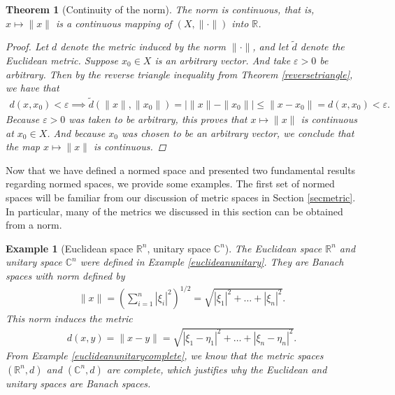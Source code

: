 \documentclass[11pt]{article}
\theoremstyle{mystyle}
\newtheorem{thm}{Theorem}[section]
\newtheorem{protoexamp}{Example}[section]
\newenvironment{examp}
{\colorlet{shadecolor}{orange!15}\begin{shaded}\begin{protoexamp}}
{\end{protoexamp}\end{shaded}}
\newcommand{\0}{\mathbf{0}}
\begin{document}
\begin{thm}[Continuity of the norm]\label{normcontinuous}
The norm is continuous, that is, $x \longmapsto \| x\|$ is a continuous mapping of $(X, \| \cdot \|)$ into $\mathbb{R}$.
\begin{proof}
Let $d$ denote the metric induced by the norm $\| \cdot \|$, and let $\tilde{d}$ denote the Euclidean metric.
Suppose $x_0 \in X$ is an arbitrary vector. And take $\varepsilon > 0$ be arbitrary.\newline
Then by the reverse triangle inequality from Theorem \ref{reversetriangle}, we have that
\begin{align*}
    d(x, x_0) < \varepsilon \implies \tilde{d}(\| x\|, \| x_0\|) = \left| \|x\| - \| x_0 \| \right| \leq \| x - x_0\| = d(x, x_0) < \varepsilon.
\end{align*}
Because $\varepsilon > 0$ was taken to be arbitrary, this proves that $x \longmapsto \| x\|$ is continuous at $x_0 \in X$. And because $x_0$ was chosen to be an arbitrary vector, we conclude that the map $x \longmapsto \| x\|$ is continuous.
\end{proof}
\end{thm}

Now that we have defined a normed space and presented two fundamental results regarding normed spaces, we provide some examples. The first set of normed spaces will be familiar from our discussion of metric spaces in Section \ref{secmetric}. In particular, many of the metrics we discussed in this section can be obtained from a norm.
\begin{examp}[Euclidean space $\mathbb{R}^n$, unitary space $\mathbb{C}^n$]\label{euclideanunitarynorm}
The Euclidean space $\mathbb{R}^n$ and unitary space $\mathbb{C}^n$ were defined in Example \ref{euclideanunitary}. They are Banach spaces with norm defined by
\begin{align*}
    \| x \| = \left( \sum_{i=1}^n |\xi_i|^2 \right)^{1/2} = \sqrt{|\xi_1|^2 + \ldots + |\xi_n|^2}.
\end{align*}
This norm induces the metric
\begin{align*}
    d(x, y) = \| x - y\| = \sqrt{|\xi_1 - \eta_1|^2 + \ldots + |\xi_n - \eta_n|^2}.
\end{align*}
From Example \ref{euclideanunitarycomplete}, we know that the metric spaces $(\mathbb{R}^n, d)$ and $(\mathbb{C}^n, d)$ are complete, which justifies why the Euclidean and unitary spaces are Banach spaces.
\end{examp}
\end{document}
